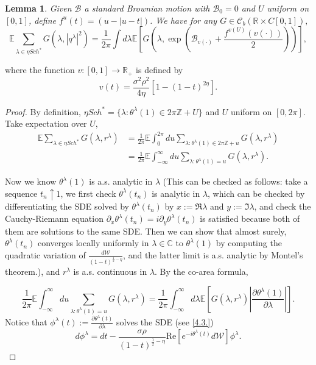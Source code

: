 \documentclass[12pt, reqno]{amsart}
\newtheorem{lemma}[theorem]{Lemma}
\theoremstyle{definition}
\theoremstyle{remark}
\numberwithin{equation}{section}
\begin{document}
\begin{lemma}\label{lemma3.76}
    Given $\mathcal{B}$ a standard Brownian motion with $\mathcal{B}_0=0$ and $U$ uniform on $[0,1]$, define $f^u(t)=(u-|u-t|)$. We have for any $G\in \mathcal{C}_b(\mathbb{R}\times C[0,1]),$
    $$
\mathbb{E}\sum_{\lambda\in\eta Sch^*}G(\lambda,|q^\lambda|^2)=\frac{1}{2\pi}\int d\lambda\mathbb{E}\left[G\left(\lambda,\exp(\mathcal{B}_{v(\cdot)}+\frac{f^{v(U)}(v(\cdot))}{2})\right)\right],$$
\end{lemma}
where the function $v:[0,1]\to\mathbb{R}_+$ is defined by  \begin{equation}\label{whatisvt?}v(t)=\frac{\sigma^2\rho^2}{4\eta}[1-(1-t)^{2\eta}].\end{equation}
\begin{proof}
    By definition, $\eta Sch^*=\{\lambda:\theta^\lambda(1)\in 2\pi\mathbb{Z}+U\}$ and $U$ uniform on $[0,2\pi]$. Take expectation over $U$,
    $$\begin{aligned}
\mathbb{E}\sum_{\lambda\in\eta Sch^*}G(\lambda,r^\lambda)&=\frac{1}{2\pi}\mathbb{E}\int_0^{2\pi} du \sum_{\lambda:\theta^\lambda(1)\in 2\pi\mathbb{Z}+u}G(\lambda,r^\lambda)\\&=\frac{1}{2\pi}\mathbb{E}\int_{-\infty}^\infty du \sum_{\lambda:\theta^\lambda(1)=u}G(\lambda,r^\lambda).\end{aligned}   $$

Now we know $\theta^\lambda(1)$ is a.s. analytic in $\lambda$ (This can be checked as follows: take a sequence $t_n\uparrow 1$, we first check $\theta^\lambda(t_n)$ is analytic in $\lambda$, which can be checked by differentiating the SDE solved by $\theta^\lambda(t_n)$ by $x:=\Re\lambda$ and $y:=\Im\lambda$, and check the Cauchy-Riemann equation $\partial_x \theta^\lambda(t_n)=i\partial_y \theta^\lambda(t_n)$ is satisfied because both of them are solutions to the same SDE. Then we can show that almost surely, $\theta^\lambda(t_n)$ converges locally uniformly in $\lambda\in\mathbb{C}$ to $\theta^\lambda(1)$ by computing the quadratic variation of $\frac{d\mathcal{W}}{(1-t)^{\frac{1}{2}-\eta}}$, and the latter limit is a.s. analytic by Montel's theorem.), and $r^\lambda$ is a.s. continuous in $\lambda$. By the co-area formula, 

\begin{equation}
    \frac{1}{2\pi}\mathbb{E}\int_{-\infty}^\infty du \sum_{\lambda:\theta^\lambda(1)=u}G(\lambda,r^\lambda)=\frac{1}{2\pi}\int_{-\infty}^\infty d\lambda \mathbb{E}[G(\lambda, r^\lambda)|\frac{\partial \theta^\lambda(1)}{\partial \lambda}|].
\end{equation}
Notice that $\phi^\lambda(t):=\frac{\partial\theta^\lambda(t)}{\partial\lambda}$ solves the SDE (see \eqref{4.3.})
$$d\phi^\lambda=dt-\frac{\sigma\rho}{(1-t)^{\frac{1}{2}-\eta}}\text{Re}\left[e^{-i\theta^\lambda(t)}d\mathcal{W}\right]\phi^\lambda.$$


\end{proof}
\end{document}
